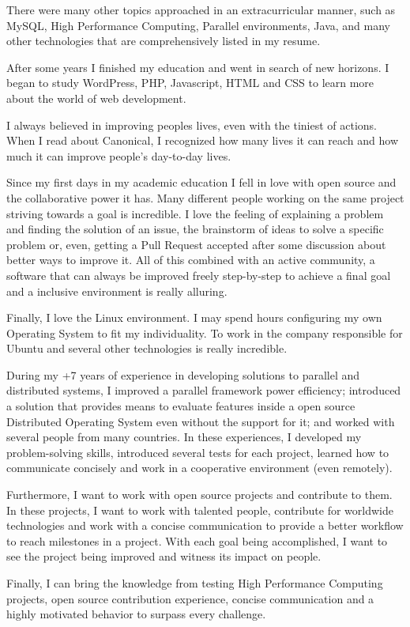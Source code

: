 \documentclass[11pt, a4paper]{awesome-cv}
\begin{document}
\begin{cvletter}
There were many other topics approached in an extracurricular manner, such as
MySQL, High Performance Computing, Parallel environments, Java, and many other
technologies that are comprehensively listed in my resume.

After some years I finished my education and went in search of new horizons. I
began to study WordPress, PHP, Javascript, HTML and CSS to learn more about the
world of web development.

I always believed in improving peoples lives, even with the tiniest of  actions.
When I read about Canonical, I recognized how many lives it can reach and how
much it can improve people's day-to-day lives.

Since my first days in my academic education I fell in love with open source and
the collaborative power it has.  Many different people working on the same
project striving towards a goal is incredible. I love the feeling of explaining
a problem and finding the solution of an issue, the brainstorm of ideas to solve
a specific problem or, even, getting a Pull Request accepted after some
discussion about better ways to improve it. All of this combined with an active
community, a software that can always be improved freely step-by-step to achieve
a final goal and a inclusive environment is really alluring.

Finally, I love the Linux environment. I may spend hours configuring my own
Operating System to fit my individuality. To work in the company responsible for
Ubuntu and several other technologies is really incredible.

During my +7 years of experience in developing solutions to parallel and
distributed systems, I improved a parallel framework power efficiency;
introduced a solution that provides means to evaluate features inside a open
source Distributed Operating System even without the support for it; and worked
with several people from many countries. In these experiences, I developed my
problem-solving skills, introduced several tests for each project, learned how
to communicate concisely and work in a cooperative environment (even remotely).

Furthermore, I want to work with open source projects and contribute to them. In these
projects, I want to work with talented people, contribute for worldwide
technologies and work with a concise communication to provide a better workflow
to reach milestones in a project. With each goal being accomplished, I want to
see the project being improved and witness its impact on people.

Finally, I can bring the knowledge from testing High Performance Computing
projects, open source contribution experience, concise communication and a
highly motivated behavior to surpass every challenge.

\end{cvletter}


\makeletterclosing
\end{document}
